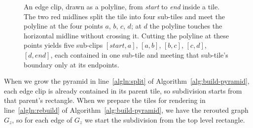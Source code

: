 \begin{figure}[!tb]
  \centering
  \caption{An edge clip, drawn as a polyline, from \emph{start} to
    \emph{end} inside a tile. The two red midlines split the tile
    into four sub-tiles and meet the polyline at the four
    points $a$, $b$, $c$, $d$; at $d$ the polyline touches the
    horizontal midline without crossing it. Cutting the polyline at
    these points yields five sub-clips $[\mathit{start},a]$,
    $[a,b]$, $[b,c]$, $[c,d]$, $[d,\mathit{end}]$, each contained in
    one sub-tile and meeting that sub-tile's boundary only at its
    endpoints.}
  \label{fig:clip}
\end{figure}

When we grow the pyramid in line~\ref{algln:split} of
Algorithm~\ref{alg:build-pyramid}, each edge clip is already
contained in its parent tile, so subdivision starts from that
parent's rectangle. When we prepare the tiles for rendering in
line~\ref{algln:rebuild} of Algorithm~\ref{alg:build-pyramid}, we
have the rerouted graph $G_z$, so for each edge of $G_z$ we start
the subdivision from the top level rectangle.

